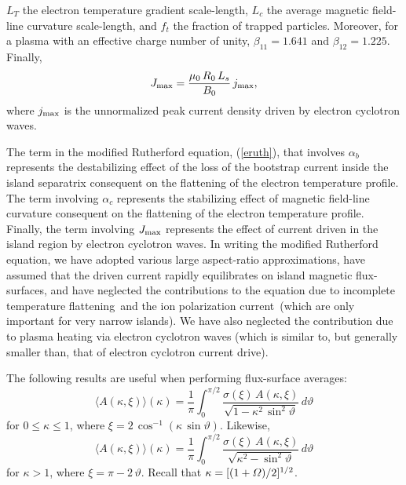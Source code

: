 \documentclass[12pt,prb,aps]{revtex4-1}
\begin{document}
$L_T$ the electron temperature gradient scale-length, $L_c$ the average magnetic field-line curvature scale-length, and $f_t$  the fraction of trapped particles. Moreover, for a plasma with an effective charge
number of unity, $\beta_{11}=1.641$ and $\beta_{12}= 1.225$.\cite{fitz}
Finally,
\begin{equation}\label{ecur}
J_{\rm max} = \frac{\mu_0\,R_0\,L_s}{B_0}\,j_{\rm max},
\end{equation}
where $j_{\rm max}$ is the unnormalized peak current density driven by electron cyclotron waves.  
 
 The term in the modified Rutherford equation, (\ref{eruth}),  that involves $\alpha_b$  represents  the
 destabilizing effect of the loss of the bootstrap current inside the island separatrix consequent on the flattening of the electron temperature profile. \cite{ntm2,car} The term involving $\alpha_c$ represents  the stabilizing effect of  magnetic field-line curvature  consequent on the flattening of the electron temperature profile.\cite{fitz,kot} Finally, the term involving $J_{\rm max}$ represents the effect of current driven in the island region by electron cyclotron waves.\cite{island} In writing the modified
 Rutherford equation, we have adopted various large aspect-ratio approximations,\cite{ggj1,fitz} have assumed that the driven current rapidly equilibrates on
 island magnetic flux-surfaces, 
and have  neglected the contributions to the equation due to incomplete temperature flattening\,\cite{ntm2} and the ion polarization current\,\cite{polz} (which are only important for
 very narrow islands). We  have also neglected the contribution due to
 plasma heating via electron cyclotron waves (which is similar to, but generally smaller than, that of electron cyclotron current drive).\cite{ntm4,island}
 
 The following results are useful when performing flux-surface averages:\,\cite{island}
\begin{equation}
\langle A(\kappa,\xi)\rangle(\kappa) = \frac{1}{\pi}\int_0^{\pi/2}\frac{\sigma(\xi)\,A(\kappa,\xi)}{\sqrt{1-\kappa^2\,\sin^2\vartheta}}\,d\vartheta
\end{equation}
for $0\leq \kappa\leq 1$, where $\xi=2\,\cos^{-1}(\kappa\,\sin\vartheta)$. Likewise, 
\begin{equation}
\langle A(\kappa,\xi)\rangle(\kappa) = \frac{1}{\pi}\int_0^{\pi/2}\frac{\sigma(\xi)\,A(\kappa,\xi)}{\sqrt{\kappa^2-\sin^2\vartheta}}\,d\vartheta
\end{equation}
for $\kappa>1$, where $\xi=\pi-2\,\vartheta$. Recall that $\kappa=[(1+{\mit\Omega})/2]^{1/2}$. 
\end{document}
